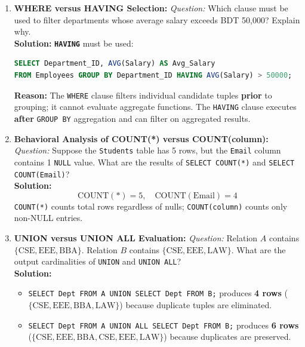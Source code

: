 \begin{enumerate}[resume*]
\item \textbf{WHERE versus HAVING Selection:}
\textit{Question:} Which clause must be used to filter departments whose average salary exceeds BDT 50,000? Explain why. \\
\textbf{Solution:} \textbf{\texttt{HAVING}} must be used:
\begin{lstlisting}[language=SQL]
SELECT Department_ID, AVG(Salary) AS Avg_Salary
FROM Employees GROUP BY Department_ID HAVING AVG(Salary) > 50000;
\end{lstlisting}
\textbf{Reason:} The \texttt{WHERE} clause filters individual candidate tuples \textbf{prior} to grouping; it cannot evaluate aggregate functions. The \texttt{HAVING} clause executes \textbf{after} \texttt{GROUP BY} aggregation and can filter on aggregated results.

\item \textbf{Behavioral Analysis of COUNT(*) versus COUNT(column):}
\textit{Question:} Suppose the \texttt{Students} table has 5 rows, but the \texttt{Email} column contains 1 \texttt{NULL} value. What are the results of \texttt{SELECT COUNT(*)} and \texttt{SELECT COUNT(Email)}? \\
\textbf{Solution:}
\[
\text{COUNT}(*) = 5, \quad \text{COUNT}(\text{Email}) = 4
\]
\texttt{COUNT(*)} counts total rows regardless of nulls; \texttt{COUNT(column)} counts only non-NULL entries.

\item \textbf{UNION versus UNION ALL Evaluation:}
\textit{Question:} Relation $A$ contains $\{\text{CSE}, \text{EEE}, \text{BBA}\}$. Relation $B$ contains $\{\text{CSE}, \text{EEE}, \text{LAW}\}$. What are the output cardinalities of \texttt{UNION} and \texttt{UNION ALL}? \\
\textbf{Solution:}
\begin{itemize}
    \item \texttt{SELECT Dept FROM A UNION SELECT Dept FROM B;} produces \textbf{4 rows} ($\{\text{CSE}, \text{EEE}, \text{BBA}, \text{LAW}\}$) because duplicate tuples are eliminated.
    \item \texttt{SELECT Dept FROM A UNION ALL SELECT Dept FROM B;} produces \textbf{6 rows} ($\{\text{CSE}, \text{EEE}, \text{BBA}, \text{CSE}, \text{EEE}, \text{LAW}\}$) because duplicates are preserved.
\end{itemize}


\end{enumerate}
